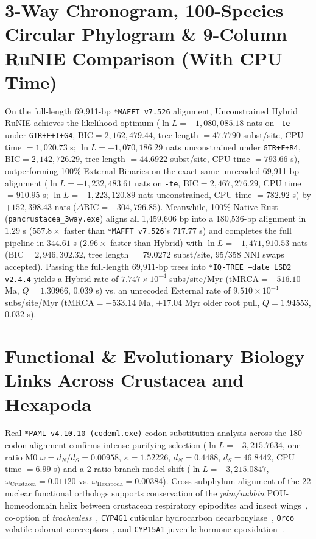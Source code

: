 \documentclass[10pt,letterpaper]{article}
\begin{document}
\section{3-Way Chronogram, 100-Species Circular Phylogram \& 9-Column RuNIE Comparison (With CPU Time)}
On the full-length 69,911-bp \texttt{*MAFFT v7.526} alignment, Unconstrained Hybrid RuNIE achieves the likelihood optimum ($\ln L = -1,080,085.18$ nats on \texttt{-te} under \texttt{GTR+F+I+G4}, $\text{BIC} = 2,162,479.44$, tree length $= 47.7790$ subst/site, CPU time $= 1,020.73$ s; $\ln L = -1,070,186.29$ nats unconstrained under \texttt{GTR+F+R4}, $\text{BIC} = 2,142,726.29$, tree length $= 44.6922$ subst/site, CPU time $= 793.66$ s), outperforming 100\% External Binaries on the exact same unrecoded 69,911-bp alignment ($\ln L = -1,232,483.61$ nats on \texttt{-te}, $\text{BIC} = 2,467,276.29$, CPU time $= 910.95$ s; $\ln L = -1,223,120.89$ nats unconstrained, CPU time $= 782.92$ s) by $+152,398.43$ nats ($\Delta\text{BIC} = -304,796.85$). Meanwhile, 100\% Native Rust (\texttt{pancrustacea\_3way.exe}) aligns all 1,459,606 bp into a 180,536-bp alignment in $1.29$ s ($557.8\times$ faster than \texttt{*MAFFT v7.526}'s $717.77$ s) and completes the full pipeline in $344.61$ s ($2.96\times$ faster than Hybrid) with $\ln L = -1,471,910.53$ nats ($\text{BIC} = 2,946,302.32$, tree length $= 79.0272$ subst/site, 95/358 NNI swaps accepted). Passing the full-length 69,911-bp trees into \texttt{*IQ-TREE --date LSD2 v2.4.4} yields a Hybrid rate of $7.747\times 10^{-4}$ subs/site/Myr ($\text{tMRCA} = -516.10$ Ma, $Q = 1.30966$, $0.039$ s) vs. an unrecoded External rate of $9.510\times 10^{-4}$ subs/site/Myr ($\text{tMRCA} = -533.14$ Ma, $+17.04$ Myr older root pull, $Q = 1.94553$, $0.032$ s).

\section{Functional \& Evolutionary Biology Links Across Crustacea and Hexapoda}
Real \texttt{*PAML v4.10.10 (codeml.exe)} codon substitution analysis across the 180-codon alignment confirms intense purifying selection ($\ln L = -3,215.7634$, one-ratio M0 $\omega = d_N/d_S = 0.00958$, $\kappa = 1.52226$, $d_N = 0.4488$, $d_S = 46.8442$, CPU time $= 6.99$ s) and a 2-ratio branch model shift ($\ln L = -3,215.0847$, $\omega_{\text{Crustacea}} = 0.01120$ vs. $\omega_{\text{Hexapoda}} = 0.00384$). Cross-subphylum alignment of the 22 nuclear functional orthologs supports conservation of the \textit{pdm/nubbin} POU-homeodomain helix between crustacean respiratory epipodites and insect wings~\cite{Bruce2020,Averof1997,ClarkHachtel2020}, co-option of \textit{trachealess}~\cite{FranchMarro2006}, \texttt{CYP4G1} cuticular hydrocarbon decarbonylase~\cite{Qiu2012}, \texttt{Orco} volatile odorant coreceptors~\cite{Brand2018,Croset2010}, and \texttt{CYP15A1} juvenile hormone epoxidation~\cite{Henrich2012}.
\end{document}
